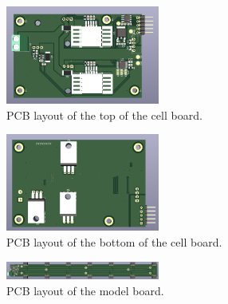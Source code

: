 \FloatBarrier
\begin{figure}[h]
    \centering
    \includegraphics[width=0.45\textwidth]{pcb_cell_board_top.png}
    \caption{PCB layout of the top of the cell board.}
    \label{fig:pcb_top_cellboard}
\end{figure}
\FloatBarrier
\begin{figure}[h]
    \centering
    \includegraphics[width=0.45\textwidth]{pcb_cell_board_bottom.png}
    \caption{PCB layout of the bottom of the cell board.}
    \label{fig:pcb_bottom_cellboard}
\end{figure}
\FloatBarrier
\begin{figure}[h]
    \centering
    \includegraphics[width=0.45\textwidth]{pcb_model_board_top.png}
    \caption{PCB layout of the model board.}
    \label{fig:pcb_modelboard}
\end{figure}
